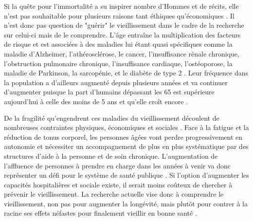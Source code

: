 Si la quête pour l'immortalité a su inspirer nombre d'Hommes et de récits, elle n'est pas souhaitable pour plusieurs raisons tant éthiques qu'économiques \cite{Hayflick2000}. Il n'est donc pas question de "guérir" le vieillissement dans le cadre de la recherche sur celui-ci mais de le comprendre. L'âge entraîne la multiplication des facteurs de risque et est associées à des maladies lui étant quasi spécifiques comme la maladie d'Alzheimer, l'athérosclérose, le cancer, l'insuffisance rénale chronique, l'obstruction pulmonaire chronique, l'insuffisance cardiaque, l'ostéoporose, la maladie de Parkinson, la sarcopénie, et le diabète de type 2 \cite{Kubben2017}. Leur fréquence dans la population a d'ailleurs augmenté depuis plusieurs années et va continuer d'augmenter puisque la part d'humains dépassant les 65 est supérieure aujourd'hui à celle des moins de 5 ans et qu'elle croît encore \cite{Phillips2021Apr}. 

De la fragilité qu'engendrent ces maladies du vieillissement découlent de nombreuses contraintes physiques, économiques et sociales \cite{Blasimme2017Feb}. Face à la fatigue et la réduction de tonus corporel, les personnes âgées vont perdre progressivement en autonomie et nécessiter un accompagnement de plus en plus systématique par des structures d'aide à la personne et de soin chronique. L'augmentation de l'affluence de personnes à prendre en charge dans les années à venir va donc représenter un défi pour le système de santé publique \cite{Phillips2021Apr}. Si l'option d'augmenter les capacités hospitalières et sociale existe, il serait moins coûteux de chercher à prévenir le vieillissement. La recherche actuelle vise donc à comprendre le vieillissement, non pas pour augmenter la longévité, mais plutôt pour contrer à la racine ses effets néfastes pour finalement vieillir en bonne santé \cite{Ferrucci2020Feb}.




